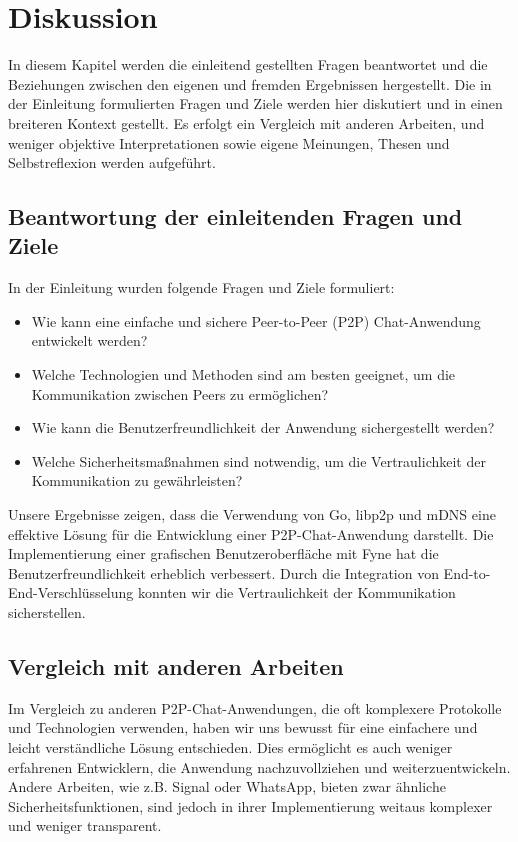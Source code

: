 \section{Diskussion}

In diesem Kapitel werden die einleitend gestellten Fragen beantwortet und die Beziehungen zwischen den eigenen und fremden Ergebnissen hergestellt. Die in der Einleitung formulierten Fragen und Ziele werden hier diskutiert und in einen breiteren Kontext gestellt. Es erfolgt ein Vergleich mit anderen Arbeiten, und weniger objektive Interpretationen sowie eigene Meinungen, Thesen und Selbstreflexion werden aufgeführt.

\subsection{Beantwortung der einleitenden Fragen und Ziele}

In der Einleitung wurden folgende Fragen und Ziele formuliert:
\begin{itemize}
    \item Wie kann eine einfache und sichere Peer-to-Peer (P2P) Chat-Anwendung entwickelt werden?
    \item Welche Technologien und Methoden sind am besten geeignet, um die Kommunikation zwischen Peers zu ermöglichen?
    \item Wie kann die Benutzerfreundlichkeit der Anwendung sichergestellt werden?
    \item Welche Sicherheitsmaßnahmen sind notwendig, um die Vertraulichkeit der Kommunikation zu gewährleisten?
\end{itemize}

Unsere Ergebnisse zeigen, dass die Verwendung von Go, libp2p und mDNS eine effektive Lösung für die Entwicklung einer P2P-Chat-Anwendung darstellt. Die Implementierung einer grafischen Benutzeroberfläche mit Fyne hat die Benutzerfreundlichkeit erheblich verbessert. Durch die Integration von End-to-End-Verschlüsselung konnten wir die Vertraulichkeit der Kommunikation sicherstellen.

\subsection{Vergleich mit anderen Arbeiten}

Im Vergleich zu anderen P2P-Chat-Anwendungen, die oft komplexere Protokolle und Technologien verwenden, haben wir uns bewusst für eine einfachere und leicht verständliche Lösung entschieden. Dies ermöglicht es auch weniger erfahrenen Entwicklern, die Anwendung nachzuvollziehen und weiterzuentwickeln. Andere Arbeiten, wie z.B. Signal oder WhatsApp, bieten zwar ähnliche Sicherheitsfunktionen, sind jedoch in ihrer Implementierung weitaus komplexer und weniger transparent.


